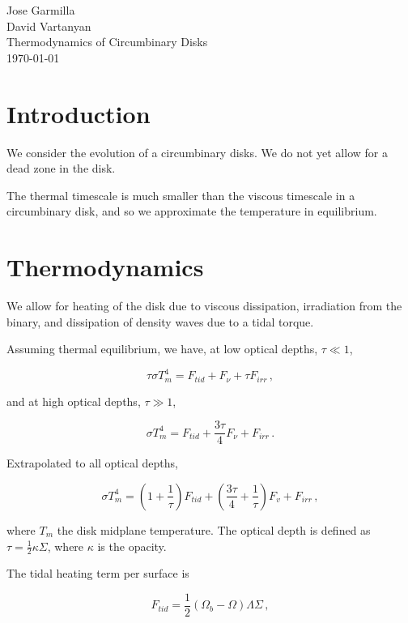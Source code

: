 \documentclass{article}
\begin{document}
\begin{flushleft}
Jose Garmilla \\
David Vartanyan\\
Thermodynamics of Circumbinary Disks\\
\today\\
\end{flushleft}

\section{Introduction}
We consider the evolution of a circumbinary disks. We do not yet allow for a dead zone in the disk.

The thermal timescale is much smaller than the viscous timescale in a circumbinary disk, and so we approximate the temperature in equilibrium.

\section{Thermodynamics}
We allow for heating of the disk due to viscous dissipation, irradiation from the binary, and dissipation of density waves due to a tidal torque.

Assuming thermal equilibrium, we have, at low optical depths, $\tau \ll 1$,

\begin{equation}
\tau \sigma T_m^4 = F_{tid} + F_{\nu} + \tau F_{irr}\,,
\end{equation}

and at high optical depths, $\tau \gg 1$,

\begin{equation}
\sigma T_m^4 = F_{tid} + \frac{3\tau}{4}  F_\nu + F_{irr}\,.
\end{equation}

Extrapolated to all optical depths,

\begin{equation} \label{eq:encon}
\sigma T_m^4 = \left(1+\frac{1}{\tau}\right) F_{tid} + \left(\frac{3\tau}{4} + \frac{1}{\tau}\right) F_{v} + F_{irr}\,,
\end{equation}

where $T_m$ the disk midplane temperature. The optical depth is defined as $\tau =\frac{1}{2} \kappa \Sigma$, where $\kappa$ is the opacity.

The tidal heating term per surface is

\begin{equation}
F_{tid} = \frac{1}{2}\left(\Omega_b - \Omega\right) \Lambda \Sigma\,,
\end{equation}
\end{document}
